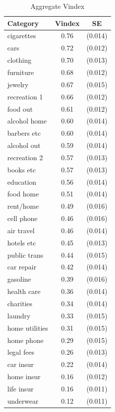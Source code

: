 \begin{table}[!h]
    \centering
\begin{tabular}{lcc}
	\hline
	Category & Vindex & SE \\
	\hline \hline
cigarettes       & 0.76 & (0.014) \\
cars             & 0.72 & (0.012) \\
clothing         & 0.70 & (0.013) \\
furniture        & 0.68 & (0.012) \\
jewelry          & 0.67 & (0.015) \\
recreation 1     & 0.66 & (0.012) \\
food out         & 0.61 & (0.012) \\
alcohol home     & 0.60 & (0.014) \\
barbers etc      & 0.60 & (0.014) \\
alcohol out      & 0.59 & (0.014) \\
recreation 2     & 0.57 & (0.013) \\
books etc        & 0.57 & (0.013) \\
education        & 0.56 & (0.014) \\
food home        & 0.51 & (0.014) \\
rent/home        & 0.49 & (0.016) \\
cell phone       & 0.46 & (0.016) \\
air travel       & 0.46 & (0.014) \\
hotels etc       & 0.45 & (0.013) \\
public trans     & 0.44 & (0.015) \\
car repair       & 0.42 & (0.014) \\
gasoline         & 0.39 & (0.016) \\
health care      & 0.36 & (0.014) \\
charities        & 0.34 & (0.014) \\
laundry          & 0.33 & (0.015) \\
home utilities   & 0.31 & (0.015) \\
home phone       & 0.29 & (0.015) \\
legal fees       & 0.26 & (0.013) \\
car insur        & 0.22 & (0.014) \\
home insur       & 0.16 & (0.012) \\
life insur       & 0.16 & (0.011) \\
underwear        & 0.12 & (0.011) \\
\hline
\end{tabular}
\label{tab:vintab}
\caption{Aggregate Vindex}
\vspace{-2in}
\end{table}

